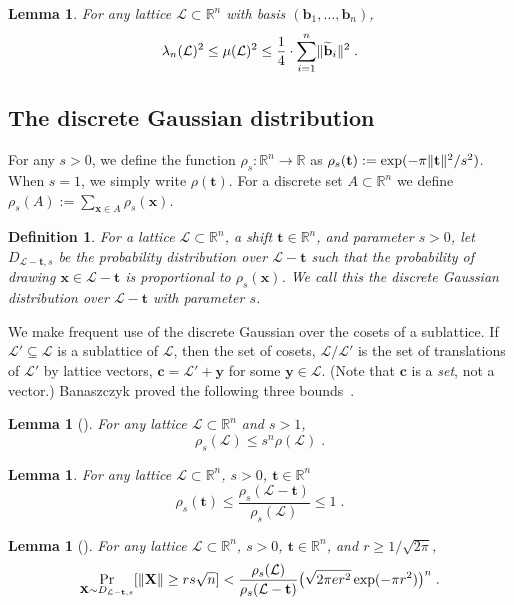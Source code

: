 \documentclass[11pt]{article}
\newtheorem{lemma}[theorem]{Lemma}
\newtheorem{definition}[theorem]{Definition}
\newcommand{\R}{\ensuremath{\mathbb{R}}}
\renewcommand{\vec}[1]{\ensuremath{\mathbf{#1}}}
\newcommand{\lat}{\mathcal{L}}
\newcommand{\gs}[1]{\ensuremath{\widetilde{#1}}}
\DeclarePairedDelimiter\length{\lVert}{\rVert}
\begin{document}
\begin{lemma} 
\label{lem:coveringradius}
For any lattice $\lat \subset \R^n$ with basis $(\vec{b}_1,\ldots, \vec{b}_n)$,
\[
\lambda_n(\lat)^2 \leq \mu(\lat)^2 \leq \frac{1}{4} \cdot \sum_{i=1}^n \length{\gs{\vec{b}}_i}^2
\; .
\]
\end{lemma}

\subsection{The discrete Gaussian distribution}

For any $s>0$, we define the function $\rho_s : \R^n \rightarrow\R$ as $\rho_s(\vec{t}) := \exp(-\pi \length{\vec{t}}^2/s^2)$. When $s=1$, we simply write $\rho(\vec{t})$. For a discrete set $A \subset \R^n$ we define $\rho_s(A) :=\sum_{\vec{x}\in A} \rho_s(\vec{x})$. 
\begin{definition} 
For a lattice $\lat \subset \R^n$, a shift $\vec{t} \in \R^n$, and parameter $s > 0$, let $D_{\lat - \vec{t},s}$ be the probability distribution over $\lat - \vec{t}$ such that the probability of drawing $\vec{x} \in \lat - \vec{t}$ is proportional to $\rho_{s}(\vec{x})$. We call this the discrete Gaussian distribution over $\lat - \vec{t}$ with parameter $s$.
\end{definition}

We make frequent use of the discrete Gaussian over the cosets of a sublattice. If $\lat' \subseteq \lat$ is a sublattice of $\lat$, then the set of cosets, $\lat/\lat'$ is the set of translations of $\lat'$ by lattice vectors, $\vec{c} = \lat' + \vec{y}$ for some $\vec{y} \in \lat$. (Note that $\vec{c}$ is a \emph{set}, not a vector.)
Banaszczyk proved the following three bounds~\cite{banaszczyk}.

\begin{lemma}[{\cite[Lemma 1.4]{banaszczyk}}]
\label{lem:banaszczyk} 
For any lattice $\lat\subset\R^n$ and $s > 1$,
\[
\rho_s(\lat) \leq s^n \rho(\lat)
\;.
\]
\end{lemma}

\begin{lemma}
\label{lem:betterrhoLtbound}
For any lattice $\lat\subset\R^n$, $s > 0$, $\vec{t} \in \R^n$
\[
\rho_s(\vec{t}) \leq \frac{\rho_s(\lat - \vec{t})}{\rho_s(\lat)} \leq 1 
\; .
\]
\end{lemma}

\begin{lemma}[{\cite[Lemma 2.13]{cvpp}}]
\label{lem:banaszczyktail} 
For any lattice $\lat\subset\R^n$, $s > 0$, $\vec{t} \in \R^n$, and $r \geq1/\sqrt{2\pi}$,
\[
\Pr_{\vec{X} \sim D_{\lat - \vec{t}, s}}[\length{\vec{X}} \geq r s\sqrt{n} ] < \frac{\rho_s(\lat)}{\rho_s(\lat - \vec{t})}\big( \sqrt{2 \pi e r^2} \exp(-\pi r^2) \big)^n
\; .
\]

\end{lemma}
\end{document}
